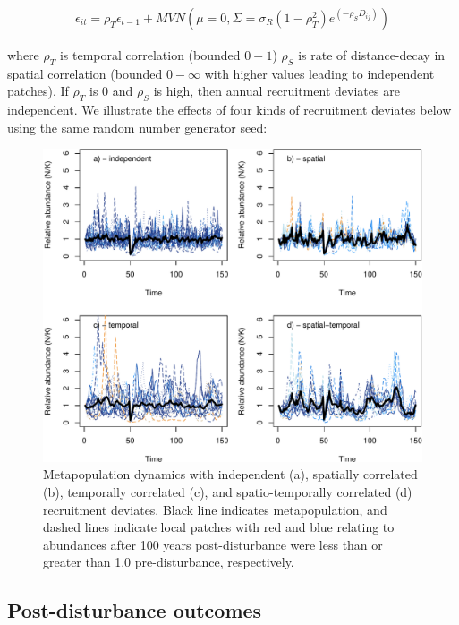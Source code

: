 \documentclass[
]{article}
\begin{document}
\begin{align}
\epsilon_{it}=\rho_T\epsilon_{t-1}+MVN(\mu=0,\Sigma=\sigma_R(1-\rho_T^2)e^{(-\rho_SD_{ij})})
\end{align}

where \(\rho_T\) is temporal correlation (bounded \(0-1\)) \(\rho_S\) is
rate of distance-decay in spatial correlation (bounded \(0-\infty\) with
higher values leading to independent patches). If \(\rho_T\) is 0 and
\(\rho_S\) is high, then annual recruitment deviates are independent. We
illustrate the effects of four kinds of recruitment deviates below using
the same random number generator seed:

\begin{figure}[H]

{\centering \includegraphics{Managing_for_ecological_surprises_in_metapopulations_files/figure-latex/independent stochasticity-1} 

}

\caption{Metapopulation dynamics with independent (a), spatially correlated (b), temporally correlated (c), and spatio-temporally correlated (d) recruitment deviates. Black line indicates metapopulation, and dashed lines indicate local patches with red and blue relating to abundances after 100 years post-disturbance were less than or greater than 1.0 pre-disturbance, respectively.}\label{fig:independent stochasticity}
\end{figure}

\hypertarget{post-disturbance-outcomes}{%
\subsection{Post-disturbance outcomes}\label{post-disturbance-outcomes}}
\end{document}
